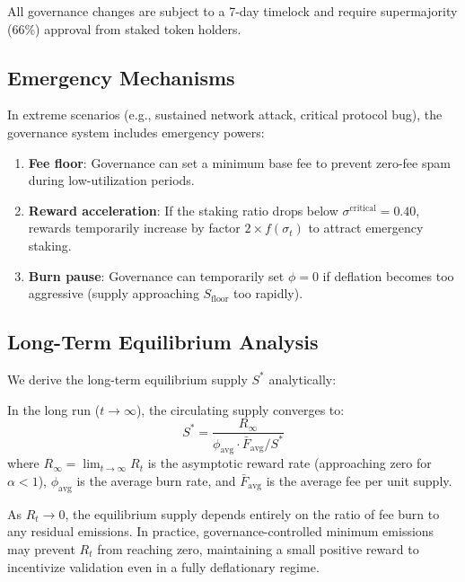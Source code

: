All governance changes are subject to a 7-day timelock and require supermajority (66\%) approval from staked token holders.

\subsection{Emergency Mechanisms}

In extreme scenarios (e.g., sustained network attack, critical protocol bug), the governance system includes emergency powers:

\begin{enumerate}
    \item \textbf{Fee floor}: Governance can set a minimum base fee to prevent zero-fee spam during low-utilization periods.
    \item \textbf{Reward acceleration}: If the staking ratio drops below $\sigma^{\text{critical}} = 0.40$, rewards temporarily increase by factor $2 \times f(\sigma_t)$ to attract emergency staking.
    \item \textbf{Burn pause}: Governance can temporarily set $\phi = 0$ if deflation becomes too aggressive (supply approaching $S_{\text{floor}}$ too rapidly).
\end{enumerate}

\subsection{Long-Term Equilibrium Analysis}

We derive the long-term equilibrium supply $S^*$ analytically:

\begin{theorem}
In the long run ($t \to \infty$), the circulating supply converges to:
\begin{equation}
    S^* = \frac{R_{\infty}}{\phi_{\text{avg}} \cdot \bar{F}_{\text{avg}} / S^*}
\end{equation}
where $R_{\infty} = \lim_{t \to \infty} R_t$ is the asymptotic reward rate (approaching zero for $\alpha < 1$), $\phi_{\text{avg}}$ is the average burn rate, and $\bar{F}_{\text{avg}}$ is the average fee per unit supply.
\end{theorem}

As $R_t \to 0$, the equilibrium supply depends entirely on the ratio of fee burn to any residual emissions. In practice, governance-controlled minimum emissions may prevent $R_t$ from reaching zero, maintaining a small positive reward to incentivize validation even in a fully deflationary regime.

